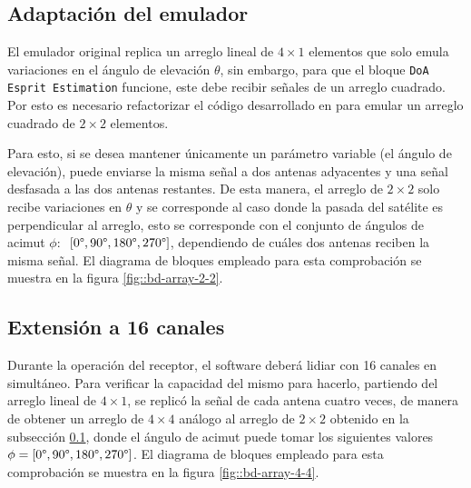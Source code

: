\documentclass[../../main.tex]{subfiles}
\begin{document}

\subsection{Adaptación del emulador}\label{subsec::adaptacion-emulador}
El emulador original replica un arreglo lineal de $4 \times 1$ elementos que solo emula variaciones en el ángulo de elevación $\theta$, sin embargo, para que el bloque \texttt{DoA Esprit Estimation} funcione, este debe recibir señales de un arreglo cuadrado. Por esto es necesario refactorizar el código desarrollado en \cite{proyecto-arce} para emular un arreglo cuadrado de $2 \times 2$ elementos.

Para esto, si se desea mantener únicamente un parámetro variable (el ángulo de elevación), puede enviarse la misma señal a dos antenas adyacentes y una señal desfasada a las dos antenas restantes. De esta manera, el arreglo de $2 \times 2$ solo recibe variaciones en $\theta$ y se corresponde al caso donde la pasada del satélite es perpendicular al arreglo, esto se corresponde con el conjunto de ángulos de acimut $\phi:$~$[0\degree, 90\degree, 180\degree, 270\degree]$, dependiendo de cuáles dos antenas reciben la misma señal. El diagrama de bloques empleado para esta comprobación se muestra en la figura \ref{fig::bd-array-2-2}.


\subsection{Extensión a 16 canales}\label{subsec::ext-16-canales}
Durante la operación del receptor, el software deberá lidiar con 16 canales en simultáneo. Para verificar la capacidad del mismo para hacerlo, partiendo del arreglo lineal de $4 \times 1$, se replicó la señal de cada antena cuatro veces, de manera de obtener un arreglo de $4 \times 4$ análogo al arreglo de $2 \times 2$ obtenido en la subsección \ref{subsec::adaptacion-emulador}, donde el ángulo de acimut puede tomar los siguientes valores $\phi = [0\degree, 90\degree, 180\degree, 270\degree]$. El diagrama de bloques empleado para esta comprobación se muestra en la figura \ref{fig::bd-array-4-4}.

\end{document}
